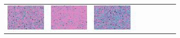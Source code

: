 \documentclass{ipol}
\begin{document}
\begin{figure}[ht]
\begin{subfigure}[t]{\linewidth}
\begin{tabular}{ccccccccc}
                \includegraphics[width=\s]{images/tower/AHD/iso_n5_64_grids.png}&
                \includegraphics[width=\s]{images/tower/DCB/iso_n5_64_grids.png}&
                \includegraphics[width=\s]{images/tower/DHT/iso_n5_64_grids.png}&

\end{tabular}
\end{subfigure}
\end{figure}
\end{document}
